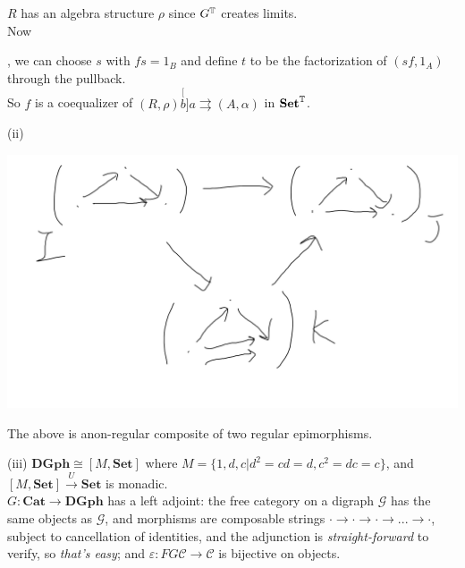 \documentclass[a4paper]{article}
\begin{document}

$R$ has an algebra structure $\rho$ since $G^{\mathbb{T}}$ creates limits.\\
Now
, we can choose $s$ with $fs = 1_B$ and define $t$ to be the factorization of $(sf,1_A)$ through the pullback.\\
So $f$ is a coequalizer of $(R,\rho) \stackrel[b]{a}{\rightrightarrows} (A,\alpha)$ in $\mathbf{Set}^{\mathbb{T}}$.

(ii) 

\includegraphics[scale=0.5]{image/Cat_08.png}

The above is anon-regular composite of two regular epimorphisms.

(iii) $\mathbf{DGph} \cong [M,\mathbf{Set}]$ where $M=\{1,d,c|d^2=cd=d,c^2=dc=c\}$, and $[M,\mathbf{Set}] \xrightarrow{U} \mathbf{Set}$ is monadic.\\
$G:\mathbf{Cat} \to \mathbf{DGph}$ has a left adjoint: the free category on a digraph $\mathcal{G}$ has the same objects as $\mathcal{G}$, and morphisms are composable strings $\cdot \to \cdot \to \cdot \to ... \to \cdot$, subject to cancellation of identities, and the adjunction is \emph{straight-forward} to verify, so \emph{that's easy}; and $\varepsilon:FG\mathcal{C} \to \mathcal{C}$ is bijective on objects.
\end{document}
